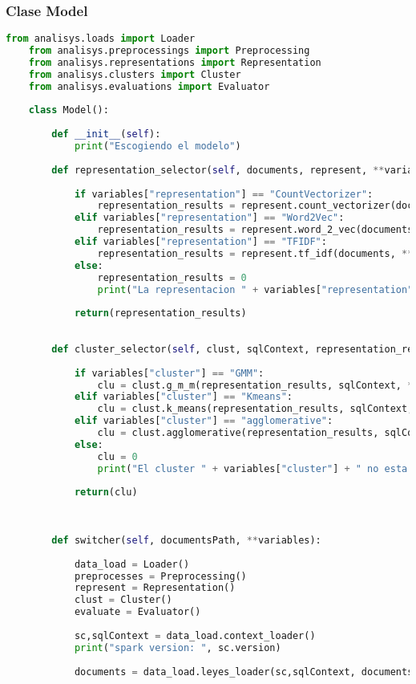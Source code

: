 \documentclass[12pt]{article}
\begin{document}
	\subsubsection*{ Clase Model}
	\begin{lstlisting}[language=Python, caption= Clase model]
	from analisys.loads import Loader
	from analisys.preprocessings import Preprocessing
	from analisys.representations import Representation
	from analisys.clusters import Cluster
	from analisys.evaluations import Evaluator
	
	class Model():
	
		def __init__(self):
			print("Escogiendo el modelo")
		
		def representation_selector(self, documents, represent, **variables):
		
			if variables["representation"] == "CountVectorizer":
				representation_results = represent.count_vectorizer(documents, **variables)
			elif variables["representation"] == "Word2Vec":
				representation_results = represent.word_2_vec(documents, **variables)
			elif variables["representation"] == "TFIDF":
				representation_results = represent.tf_idf(documents, **variables)
			else:
				representation_results = 0
				print("La representacion " + variables["representation"] + " no esta disponible")
			
			return(representation_results)
		
		
		def cluster_selector(self, clust, sqlContext, representation_results,  **variables):
		
			if variables["cluster"] == "GMM":
				clu = clust.g_m_m(representation_results, sqlContext, **variables)
			elif variables["cluster"] == "Kmeans":
				clu = clust.k_means(representation_results, sqlContext, **variables)
			elif variables["cluster"] == "agglomerative":
				clu = clust.agglomerative(representation_results, sqlContext, **variables)
			else:
				clu = 0
				print("El cluster " + variables["cluster"] + " no esta disponible")
			
			return(clu)
		
		
		
		def switcher(self, documentsPath, **variables):
		
			data_load = Loader()
			preprocesses = Preprocessing()
			represent = Representation()
			clust = Cluster()
			evaluate = Evaluator() 
			
			sc,sqlContext = data_load.context_loader()
			print("spark version: ", sc.version)
			
			documents = data_load.leyes_loader(sc,sqlContext, documentsPath)
			

\end{lstlisting}
\end{document}
